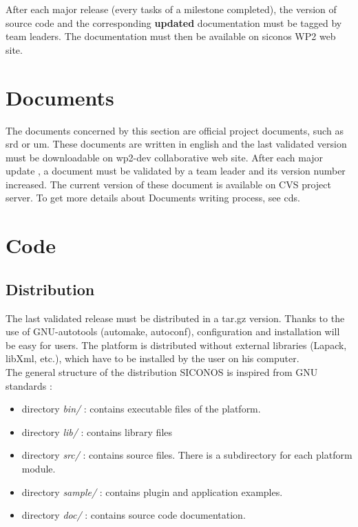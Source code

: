 After each major release (every tasks of a milestone completed), the version of source code and the corresponding \textbf{updated} documentation must
be tagged by team leaders. The documentation must then be available on \ac{siconos} WP2 web site.

\section{Documents}

The documents concerned by this section are official project documents, such as \ac{srd} or \ac{um}. These documents are written in english and the last 
validated version must be downloadable on wp2-dev collaborative web site. 
After each major update , a document must be validated by a team leader and its version number increased.
The current version of these document is available on CVS project server.
To get more details about Documents writing process, see \ac{cds}.

\section{Code}




\subsection{Distribution}




The last validated release must be distributed in a tar.gz version. Thanks to the use of GNU-autotools (automake, autoconf), configuration and installation will 
be easy for users. The platform is distributed without external libraries (Lapack, libXml, etc.), which have to be installed by the user on his computer. \\

The general structure of the distribution SICONOS is inspired from GNU standards :

\begin{itemize}
\item directory \textit{bin/} : contains executable files of the platform.
\item directory \textit{lib/} : contains library files 
\item directory \textit{src/} : contains source files. There is a subdirectory for each platform module.
\item directory \textit{sample/} : contains plugin and application examples.
\item directory \textit{doc/} : contains source code documentation.
\end{itemize}
